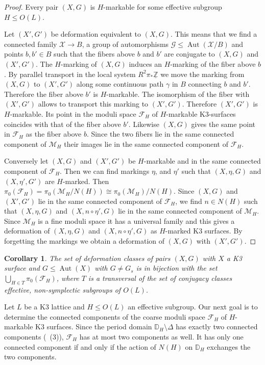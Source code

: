\documentclass[a4paper]{amsart}
\theoremstyle{definition}
\theoremstyle{plain}
\newtheorem{corollary}[definition]{Corollary}
\DeclareMathOperator{\Aut}{Aut}
\newcommand{\ZZ}{\mathbb{Z}}
\newcommand{\DD}{\mathbb{D}}
\newcommand{\X}{\mathcal{X}}
\newcommand{\M}{\mathcal{M}}
\newcommand{\F}{\mathcal{F}}
\newcommand{\G}{\mathcal{G}}
\begin{document}
\begin{proof}
Every pair $(X,G)$ is $H$-markable for some effective subgroup $H\leq O(L)$.

Let $(X',G')$ be deformation equivalent to $(X,G)$. This means that we find a connected family
$\X \to B$, a group of automorphisms $\G\leq \Aut(\X/B)$ and points $b,b' \in B$ such that the fibers above $b$ and $b'$ are conjugate to $(X,G)$ and $(X',G')$. The $H$-marking of $(X,G)$ induces an $H$-marking of the fiber above $b$. By parallel transport in the local system $R^2 \pi_*\underline{\ZZ}$ we move the marking from $(X,G)$ to $(X',G')$ along some continuous path $\gamma$ in $B$ connecting $b$ and $b'$. Therefore the fiber above $b'$ is $H$-markable. The isomorphism of the fiber with $(X',G')$ allows to transport this marking to $(X',G')$.  Therefore $(X',G')$ is $H$-markable. Its point in the moduli space $\F_H$ of $H$-markable K3-surfaces coincides with that of the fiber above $b'$. Likewise $(X,G)$ gives the same point in $\F_H$ as the fiber above $b$. Since the two fibers lie in the same connected component of $\M_H$ their images lie in the same connected component of $\F_H$.

Conversely let $(X,G)$ and $(X',G')$ be $H$-markable and in the same connected component of $\F_H$.
Then we can find markings $\eta$, and $\eta'$ such that $(X,\eta,G)$ and $(X,\eta',G')$ are $H$-marked.
Then $\pi_0(\F_H) = \pi_0(\M_H/N(H)) \cong \pi_0(\M_H)/N(H)$. Since $(X,G)$ and $(X',G')$ lie in the same connected component of $\F_H$, we find $n \in N(H)$ such that $(X,\eta,G)$ and $(X,n \circ \eta',G)$ lie in the same connected component of $\M_H$. Since $\M_H$ is a fine moduli space it has a universal family and this gives a deformation of $(X,\eta,G)$ and $(X,n \circ \eta',G)$ as $H$-marked K3 surfaces. By forgetting the markings we obtain a deformation of $(X,G)$ with $(X',G')$.
\end{proof}

\begin{corollary}
  The set of deformation classes of pairs $(X,G)$ with $X$ a K3 surface and $G \leq \Aut(X)$ with $G \neq G_s$ is in bijection with the set $\bigcup_{H \in T} \pi_0(\F_H)$, where $T$ is a transversal of the set of conjugacy classes effective, non-symplectic subgroups of $O(L)$.
\end{corollary}

Let $L$ be a K3 lattice and $H\leq O(L)$ an effective subgroup. Our next goal is to determine the connected components of the coarse moduli space $\F_H$ of $H$-markable K3 surfaces.
Since the period domain $\DD_H \setminus \Delta$ has exactly two connected components (~(3)), $\F_H$ has at most two components as well. It has only one connected component if and only if the action of $N(H)$ on $\DD_H$ exchanges the two components.
\end{document}
